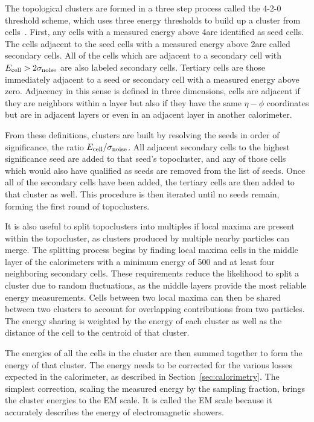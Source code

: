 The topological clusters are formed in a three step process called the 4-2-0 threshold scheme, which uses three energy thresholds to build up a cluster from cells~\cite{PERF-2014-07}.
First, any cells with a measured energy above 4\signoise are identified as seed cells. 
The cells adjacent to the seed cells with a measured energy above 2\signoise are called secondary cells.
All of the cells which are adjacent to a secondary cell with $E_\mathrm{cell} > 2\sigma_{\mathrm{noise}}$ are also labeled secondary cells.
Tertiary cells are those immediately adjacent to a seed or secondary cell with a measured energy above zero.
Adjacency in this sense is defined in three dimensions, cells are adjacent if they are neighbors within a layer but also if they have the same $\eta-\phi$ coordinates but are in adjacent layers or even in an adjacent layer in another calorimeter.

From these definitions, clusters are built by resolving the seeds in order of significance, the ratio $E_{\mathrm{cell}}/\sigma_{\mathrm{noise}}$.
All adjacent secondary cells to the highest significance seed are added to that seed's topocluster, and any of those cells which would also have qualified as seeds are removed from the list of seeds.
Once all of the secondary cells have been added, the tertiary cells are then added to that cluster as well.
This procedure is then iterated until no seeds remain, forming the first round of topoclusters.

It is also useful to split topoclusters into multiples if local maxima are present within the topocluster, as clusters produced by multiple nearby particles can merge.
The splitting process begins by finding local maxima cells in the middle layer of the calorimeters with a minimum energy of 500 \MeV and at least four neighboring secondary cells.
These requirements reduce the likelihood to split a cluster due to random fluctuations, as the middle layers provide the most reliable energy measurements.
Cells between two local maxima can then be shared between two clusters to account for overlapping contributions from two particles. The energy sharing is weighted by the energy of each cluster as well as the distance of the cell to the centroid of that cluster.

The energies of all the cells in the cluster are then summed together to form the energy of that cluster.
The energy needs to be corrected for the various losses expected in the calorimeter, as described in Section~\ref{sec:calorimetry}.
The simplest correction, scaling the measured energy by the sampling fraction, brings the cluster energies to the \ac{EM} scale.
It is called the \ac{EM} scale because it accurately describes the energy of electromagnetic showers.

